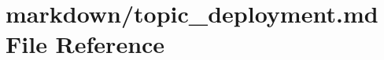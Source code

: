 \hypertarget{topic__deployment_8md}{}\section{markdown/topic\+\_\+deployment.md File Reference}
\label{topic__deployment_8md}
